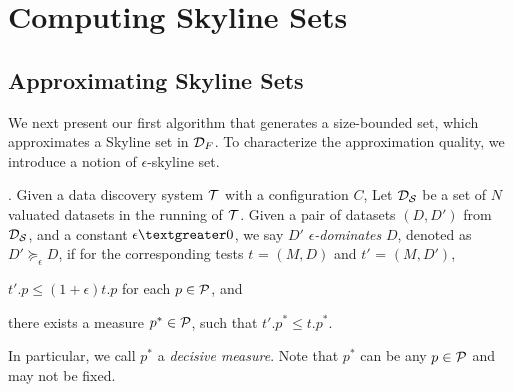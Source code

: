 \section{Computing Skyline Sets}
\label{sec-methods}



\subsection{Approximating Skyline Sets}
\label{sec-apxmodis}


We next present our first algorithm that generates a size-bounded set, which %
approximates a Skyline set in $\D_F$.  
To characterize the approximation quality, 
we introduce a notion of 
$\epsilon$-skyline set. 

. 
Given a data discovery system $\T$ with 
a configuration $C$, %
Let $\D_\S$ be a set of $N$ valuated datasets 
in the running of $\T$. 
Given a pair of datasets $(D, D')$ from $\D_\S$, and a constant $\epsilon\textgreater 0$,  
we say $D'$ {\em $\epsilon$-dominates} 
$D$, denoted as 
$D'\succeq_\epsilon D$, 
if for the corresponding 
tests $t$ = $(M, D)$ and $t'$ = $(M, D')$, 
\tbi
\item $t'.p \leq (1+\epsilon) t.p$ 
for each $p\in \P$, and  %
\item there exists a measure $p^*\in \P$, 
such that $t'.p^* \leq t.p^*$. 
\ei

In particular, we call $p^*$ a 
{\em decisive measure}. Note that 
$p^*$ can be any $p\in \P$ and 
may not be fixed. 

